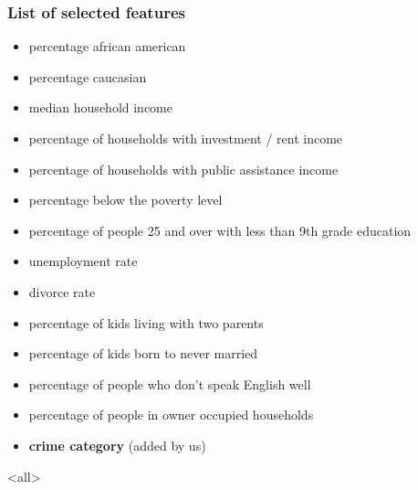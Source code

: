 \begin{frame}
  \frametitle{List of selected features}
  \begin{itemize}
    \item percentage african american
    \item percentage caucasian
    \item median household income
    \item percentage of households with investment / rent income
    \item percentage of households with public assistance income
    \item percentage below the poverty level
    \item percentage of people 25 and over with less than 9th grade education
    \item unemployment rate
    \item divorce rate
    \item percentage of kids living with two parents
    \item percentage of kids born to never married
    \item percentage of people who don't speak English well
    \item percentage of people in owner occupied households
    \item \textbf{crime category} (added by us)
  \end{itemize}
\end{frame}

\mode<all>
